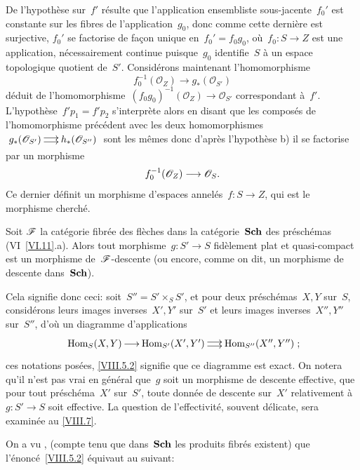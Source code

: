 De l'hypoth\`ese sur~$f'$ r\'esulte que l'application ensembliste
sous-jacente~$f_{0}'$ est constante sur les fibres de
l'application~$g_{0}$, donc comme cette derni\`ere est surjective,
$f_{0}'$ se factorise de fa\c con unique en~$f_{0}'=f_{0}g_{0}$,
o\`u~$f_{0}\colon S\to Z$ est une application, n\'ecessairement
continue puisque~$g_{0}$ identifie~$S$ \`a un espace topologique
quotient de~$S'$. Consid\'erons maintenant l'homomorphisme
$$
f_{0}^{-1}(\mathcal{O}_{Z})\to g_*(\mathcal{O}_{S'})
$$
d\'eduit de l'homomorphisme~$(f_{0}g_{0})^{-1}(\mathcal{O}_{Z})\to
\mathcal{O}_{S'}$ correspondant
\`a~$f'$. L'hypoth\`ese~$f'p_{1}=f'p_{2}$ s'interpr\`ete alors
en disant que les compos\'es de l'homomorphisme pr\'ec\'edent
avec les deux homomorphismes
$\xymatrix@C=.5cm{{g_*(\mathcal{O}_{S'})}\ar@<2pt>[r]\ar@<-2pt>[r]&{h_*(\mathcal{O}_{S''})}}$ sont les m\^emes donc d'apr\`es
l'hypoth\`ese b) il se factorise par un morphisme
$$
f_{0}^{-1}(\mathcal{O}_{Z})\to \mathcal{O}_{S}\quoi.
$$
Ce dernier d\'efinit un morphisme d'espaces annel\'es~$f\colon
S\to Z$, qui est le morphisme cherch\'e.

\begin{theoreme}
\label{VIII.5.2}
Soit $\cal{F}$ la cat\'egorie fibr\'ee des fl\`eches dans la
cat\'egorie~$\mathbf{Sch}$ des pr\'esch\'emas
\textup{(VI~\ref{VI.11}.a)}. Alors tout morphisme~$g\colon S'\to S$
fid\`element plat et quasi-compact est un morphisme
de~$\cal{F}$-descente (ou encore, comme on dit, un morphisme de
descente dans~$\mathbf{Sch}$).
\end{theoreme}

Cela signifie donc ceci: soit~$S''=S'\times_{S}S'$, et pour deux
pr\'esch\'emas~$X,Y$ sur~$S$, consid\'erons leurs images
inverses~$X',Y'$ sur~$S'$ et leurs images inverses~$X'',Y''$
sur~$S''$, d'o\`u un diagramme d'applications
$$
\xymatrix@C=.5cm{{\mathrm{Hom}_{S}(X,Y)}\ar[r]&{\mathrm{Hom}_{S'}(X',Y')}\ar@<2pt>[r]\ar@<-2pt>[r]&{\mathrm{Hom}_{S''}(X'',Y'')}}\quoi;
$$
ces notations pos\'ees, \ref{VIII.5.2} signifie que ce diagramme est
exact. On notera qu'il
n'est pas vrai en g\'en\'eral que~$g$ soit un morphisme de
descente effective, \ie que pour tout pr\'esch\'ema~$X'$
sur~$S'$, toute donn\'ee de descente sur~$X'$ relativement
\`a~$g\colon S'\to S$ soit effective. La question de
l'effectivit\'e, souvent d\'elicate, sera examin\'ee au
\No \ref{VIII.7}.

On a vu \cite{VIII.D}, (compte tenu que dans~$\mathbf{Sch}$ les produits fibr\'es
existent) que l'\'enonc\'e~\ref{VIII.5.2} \'equivaut au suivant:


